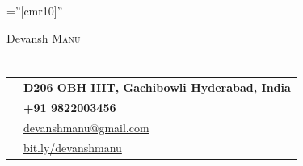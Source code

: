 \documentclass[a4paper,10pt]{article}
\begin{document}

\pagestyle{empty} %

\font\fb=''[cmr10]'' %

\par{\centering
		{\Huge Devansh \textsc{Manu}
	}\par}

\section{}

\begin{tabular}{rl}
    \textsc   &\textbf{ D206 OBH IIIT, Gachibowli Hyderabad, India} \\
    \textsc     & \textbf{+91 9822003456}\\
    \textsc    & \href{mailto:devanshmanu@gmail.com}{devanshmanu@gmail.com}\\
    \textsc     &\href{https://researchweb.iiit.ac.in/~devansh.manu/DevanshManu.pdf}{bit.ly/devanshmanu}
    
\end{tabular}

\end{document}
